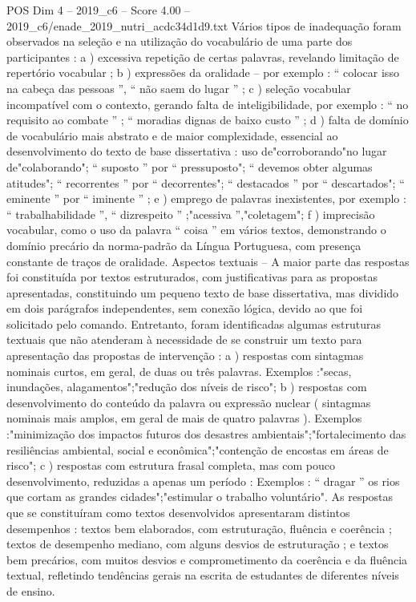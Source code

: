 \begin{textsample}{POS Dim 4 – 2019\_c6 – Score 4.00 – 2019\_c6/enade\_2019\_nutri\_acdc34d1d9.txt}
Vários tipos de inadequação foram observados na seleção e na utilização do vocabulário de uma parte dos participantes : a ) excessiva repetição de certas palavras, revelando limitação de repertório vocabular ; b ) expressões da oralidade – por exemplo : “ colocar isso na cabeça das pessoas ”, “ não saem do lugar ” ; c ) seleção vocabular incompatível com o contexto, gerando falta de inteligibilidade, por exemplo : “ no requisito ao combate ” ; “ moradias dignas de baixo custo ” ; d ) falta de domínio de vocabulário mais abstrato e de maior complexidade, essencial ao desenvolvimento do texto de base dissertativa : uso de"corroborando"no lugar de"colaborando"; “ suposto ” por “ pressuposto"; “ devemos obter algumas atitudes"; “ recorrentes ” por “ decorrentes"; “ destacados ” por “ descartados"; “ eminente ” por “ iminente ” ; e ) emprego de palavras inexistentes, por exemplo : “ trabalhabilidade ”, “ dizrespeito ” ;"acessiva ”,"coletagem"; f ) imprecisão vocabular, como o uso da palavra “ coisa ” em vários textos, demonstrando o domínio precário da norma-padrão da Língua Portuguesa, com presença constante de traços de oralidade.
Aspectos textuais – A maior parte das respostas foi constituída por textos estruturados, com justificativas para as propostas apresentadas, constituindo um pequeno texto de base dissertativa, mas dividido em dois parágrafos independentes, sem conexão lógica, devido ao que foi solicitado pelo comando.
Entretanto, foram identificadas algumas estruturas textuais que não atenderam à necessidade de se construir um texto para apresentação das propostas de intervenção : a ) respostas com sintagmas nominais curtos, em geral, de duas ou três palavras.
Exemplos :"secas, inundações, alagamentos";"redução dos níveis de risco"; b ) respostas com desenvolvimento do conteúdo da palavra ou expressão nuclear ( sintagmas nominais mais amplos, em geral de mais de quatro palavras ).
Exemplos :"minimização dos impactos futuros dos desastres ambientais";"fortalecimento das resiliências ambiental, social e econômica";"contenção de encostas em áreas de risco"; c ) respostas com estrutura frasal completa, mas com pouco desenvolvimento, reduzidas a apenas um período : Exemplos : “ dragar ” os rios que cortam as grandes cidades";"estimular o trabalho voluntário".
As respostas que se constituíram como textos desenvolvidos apresentaram distintos desempenhos : textos bem elaborados, com estruturação, fluência e coerência ; textos de desempenho mediano, com alguns desvios de estruturação ; e textos bem precários, com muitos desvios e comprometimento da coerência e da fluência textual, refletindo tendências gerais na escrita de estudantes de diferentes níveis de ensino.

\end{textsample}
